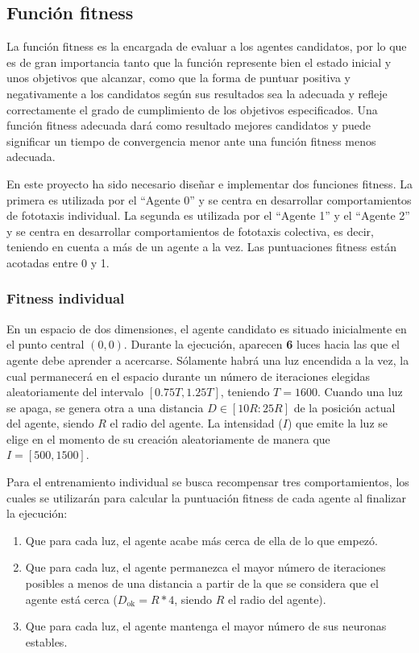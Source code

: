 \subsection{Función fitness}
La función fitness es la encargada de evaluar a los agentes candidatos, por lo que es de gran importancia tanto que la función represente bien el estado inicial y unos objetivos que alcanzar, como que la forma de puntuar positiva y negativamente a los candidatos según sus resultados sea la adecuada
y refleje correctamente el grado de cumplimiento de los objetivos especificados. Una función fitness adecuada dará como resultado mejores candidatos y puede significar un tiempo de convergencia menor ante una función fitness menos adecuada.

En este proyecto ha sido necesario diseñar e implementar dos funciones fitness. La primera es utilizada por el ``Agente 0'' y se centra en desarrollar comportamientos de fototaxis individual. La segunda es utilizada por el ``Agente 1'' y el ``Agente 2'' y se centra en desarrollar comportamientos de fototaxis
colectiva, es decir, teniendo en cuenta a más de un agente a la vez. Las puntuaciones fitness están acotadas entre 0 y 1.

\subsubsection{Fitness individual}
En un espacio de dos dimensiones, el agente candidato es situado inicialmente en el punto central $(0, 0)$. Durante la ejecución, aparecen \textbf{6} luces hacia las que el agente debe aprender a acercarse. Sólamente habrá una luz encendida a la vez, la cual permanecerá en el espacio durante un número
de iteraciones elegidas aleatoriamente del intervalo $[0.75T, 1.25T]$, teniendo $T=1600$. Cuando una luz se apaga, se genera otra a una distancia $D \in [10R:25R]$ de la posición actual del agente, siendo $R$ el radio del agente. La intensidad ($I$) que emite la luz se elige en el momento de su creación aleatoriamente de manera que
$I = [500, 1500]$.

Para el entrenamiento individual se busca recompensar tres comportamientos, los cuales se utilizarán para calcular la puntuación fitness de cada agente al finalizar la ejecución:
\begin{enumerate}
	\item{Que para cada luz, el agente acabe más cerca de ella de lo que empezó.}
	\item{Que para cada luz, el agente permanezca el mayor número de iteraciones posibles a menos de una distancia a partir de la que se considera que el agente está cerca ($D_{\text{ok}} = R*4$, siendo $R$ el radio del agente).}
	\item{Que para cada luz, el agente mantenga el mayor número de sus neuronas estables.}
\end{enumerate}

